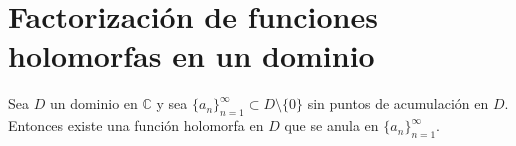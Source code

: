 \section{Factorización de funciones holomorfas en un dominio}
\begin{theorem}
    Sea $D$ un dominio en $\mathbb{C}$ y sea $\{a_n\}_{n=1}^\infty \subset D \setminus \{0\}$ sin puntos de acumulación en $D$.
    Entonces existe una función holomorfa en $D$ que se anula en $\{a_n\}_{n=1}^\infty$.
\end{theorem}
